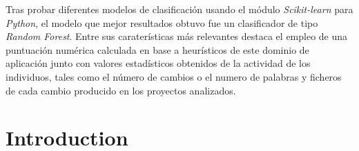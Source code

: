 \documentclass[a4paper, 12pt]{book}
\begin{document}
Tras probar diferentes modelos de clasificación usando el módulo \emph{Scikit-learn} para \emph{Python}, el modelo que mejor resultados obtuvo fue un clasificador de tipo \emph{Random Forest}. Entre sus caraterísticas más relevantes destaca el empleo de una puntuación numérica calculada en base a heurísticos de este dominio de aplicación junto con valores estadísticos obtenidos de la actividad de los individuos, tales como el número de cambios o el numero de palabras y ficheros de cada cambio producido en los proyectos analizados.







\tableofcontents 
\cleardoublepage
\listoffigures %
\cleardoublepage
\listoftables %
\cleardoublepage
\listoflistings


\cleardoublepage
\chapter{Introduction}
\label{chap:intro}
\end{document}
